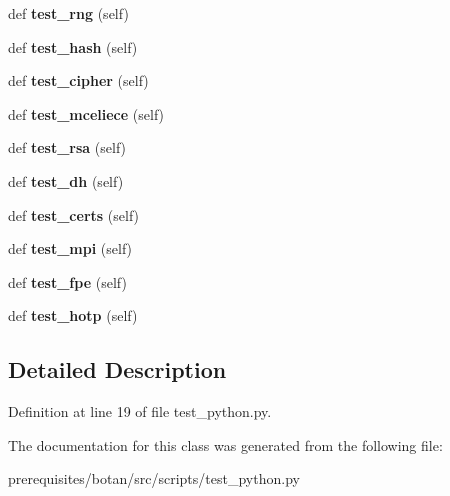 \begin{DoxyCompactItemize}
def {\bfseries test\+\_\+rng} (self)
\item 
\mbox{\label{classtest__python_1_1_botan_python_tests_a110687308dfe00d570c1b50b2dd0a662}} 
def {\bfseries test\+\_\+hash} (self)
\item 
\mbox{\label{classtest__python_1_1_botan_python_tests_abddd060a3361f8b7f253704da1dff6aa}} 
def {\bfseries test\+\_\+cipher} (self)
\item 
\mbox{\label{classtest__python_1_1_botan_python_tests_a685ed7be36d2a63e67e137368095caf8}} 
def {\bfseries test\+\_\+mceliece} (self)
\item 
\mbox{\label{classtest__python_1_1_botan_python_tests_a69fa3edc8edf8cc6337ca5d6096871fb}} 
def {\bfseries test\+\_\+rsa} (self)
\item 
\mbox{\label{classtest__python_1_1_botan_python_tests_aa469992fea9c1f7484e30952fb4ccd4e}} 
def {\bfseries test\+\_\+dh} (self)
\item 
\mbox{\label{classtest__python_1_1_botan_python_tests_aea647f66e0dfea39a3b3879548a945ac}} 
def {\bfseries test\+\_\+certs} (self)
\item 
\mbox{\label{classtest__python_1_1_botan_python_tests_ad786cb891c44ac67a1b5f4a9fc8b1334}} 
def {\bfseries test\+\_\+mpi} (self)
\item 
\mbox{\label{classtest__python_1_1_botan_python_tests_af3f8b29d803fa09adcd17a32e44ee00c}} 
def {\bfseries test\+\_\+fpe} (self)
\item 
\mbox{\label{classtest__python_1_1_botan_python_tests_ae449b1f314b886eb8eaf187619811613}} 
def {\bfseries test\+\_\+hotp} (self)
\end{DoxyCompactItemize}


\subsection{Detailed Description}


Definition at line 19 of file test\+\_\+python.\+py.



The documentation for this class was generated from the following file\+:\begin{DoxyCompactItemize}
\item 
prerequisites/botan/src/scripts/test\+\_\+python.\+py\end{DoxyCompactItemize}
